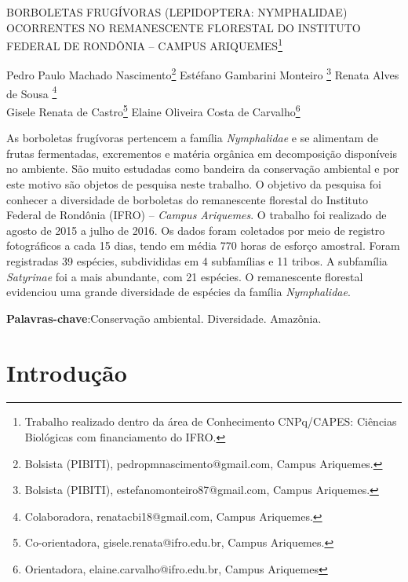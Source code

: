 \documentclass[article,12pt,onesidea,4paper,english,brazil]{abntex2}
\begin{document}
	
	
	\frenchspacing 
	
	\begin{center}
		\LARGE BORBOLETAS FRUGÍVORAS (LEPIDOPTERA: NYMPHALIDAE) OCORRENTES NO REMANESCENTE FLORESTAL DO INSTITUTO FEDERAL DE RONDÔNIA – CAMPUS ARIQUEMES\footnote{Trabalho realizado dentro da área de Conhecimento CNPq/CAPES: Ciências Biológicas com financiamento do IFRO.}
		
		\normalsize
		Pedro Paulo Machado Nascimento\footnote{Bolsista (PIBITI), pedropmnascimento@gmail.com, Campus Ariquemes.} 
		Estéfano Gambarini Monteiro \footnote{Bolsista (PIBITI), estefanomonteiro87@gmail.com, Campus Ariquemes.} 
		Renata Alves de Sousa \footnote{Colaboradora, renatacbi18@gmail.com, Campus Ariquemes.} \\
	Gisele Renata de Castro\footnote{Co-orientadora, gisele.renata@ifro.edu.br, Campus Ariquemes.} 
	Elaine Oliveira Costa de Carvalho\footnote{Orientadora, elaine.carvalho@ifro.edu.br, Campus Ariquemes}
	\end{center}
	
	\begin{resumoumacoluna}
		As borboletas frugívoras pertencem a família \textit{Nymphalidae} e se alimentam de frutas fermentadas, excrementos e matéria orgânica em decomposição disponíveis no ambiente. São muito estudadas como bandeira da conservação ambiental e por este motivo são objetos de pesquisa neste trabalho. O objetivo da pesquisa foi conhecer a diversidade de borboletas do remanescente florestal do Instituto Federal de Rondônia (IFRO) – \textit{Campus Ariquemes}. O trabalho foi realizado de agosto de 2015 a julho de 2016. Os dados foram coletados por meio de registro fotográficos a cada 15 dias, tendo em média 770 horas de esforço amostral. Foram registradas 39 espécies, subdivididas em 4 subfamílias e 11 tribos. A subfamília \textit{Satyrinae} foi a mais abundante, com 21 espécies. O remanescente florestal evidenciou uma grande diversidade de espécies da família \textit{Nymphalidae}.
		
		\vspace{\onelineskip}
		
		\noindent
		\textbf{Palavras-chave}:Conservação ambiental. Diversidade. Amazônia.
		
	\end{resumoumacoluna}
	
	\textual
	
	\section*{Introdução}
	
\end{document}
